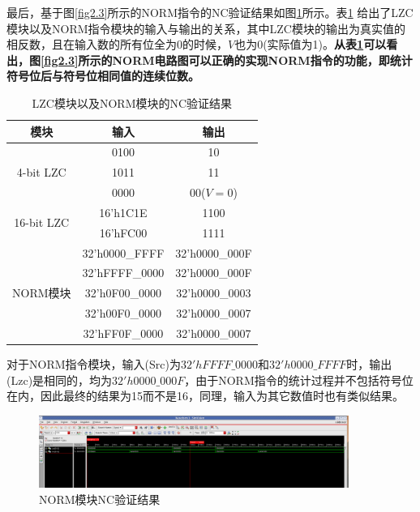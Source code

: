 \indent 最后，基于图\ref{fig2.3}所示的NORM指令的NC验证结果如图\ref{fig3.3}所示。表\ref{table3.1} 给出了LZC模块以及NORM指令模块的输入与输出的关系，其中LZC模块的输出为真实值的相反数，且在输入数的所有位全为0的时候，$V$也为0(实际值为1)。{\bfseries 从表\ref{table3.1}可以看出，图\ref{fig2.3}所示的NORM电路图可以正确的实现NORM指令的功能，即统计符号位后与符号位相同值的连续位数。}
\begin{table}[!hbpt]
\centering
\caption{LZC模块以及NORM模块的NC验证结果}
\label{table3.1}
\begin{tabular}{ccc}
\toprule
模块   & 输入   & 输出   \\
\midrule
\multirow{3}{*}{4-bit LZC} & 0100 & 10 \\
 & 1011 & 11 \\
 & 0000 & 00($V=0$) \\
\multirow{2}{*}{16-bit LZC} & 16'h1C1E & 1100  \\
& 16'hFC00 & 1111\\
\multirow{5}{*}{NORM模块} & 32'h0000\_FFFF& 32'h0000\_000F \\
& 32'hFFFF\_0000 & 32'h0000\_000F \\
& 32'h0F00\_0000 & 32'h0000\_0003 \\
& 32'h00F0\_0000 & 32'h0000\_0007 \\
& 32'hFF0F\_0000 & 32'h0000\_0007 \\

\bottomrule
\end{tabular}
\end{table}

对于NORM指令模块，输入(Src)为$32'hFFFF\_0000$和$32'h0000\_FFFF$时，输出(Lzc)是相同的，均为$32'h0000\_000F$，由于NORM指令的统计过程并不包括符号位在内，因此最终的结果为15而不是16，同理，输入为其它数值时也有类似结果。
\begin{figure}[!hbtp]
\centering
\includegraphics[width=0.9\textwidth]{chapter3/NORM_nc}
\caption{NORM模块NC验证结果}
\label{fig3.3}
\end{figure}